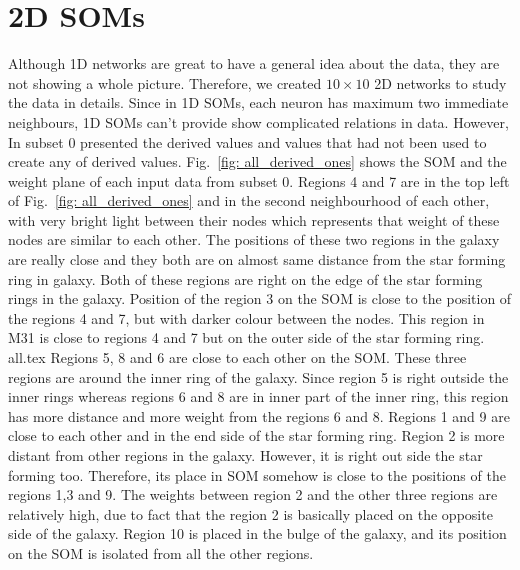  \section{2D SOMs}
 Although 1D networks are great to have a general idea about the data, they are not showing a whole picture. 
        Therefore, we created $10\times10$ 2D networks to study the data in details.
 Since in 1D SOMs, each neuron has maximum two immediate neighbours, 1D SOMs can't provide show complicated relations in data.
However, 
            In subset 0 presented the derived values and values that had not been used to create any of derived values.
            Fig.~\ref{fig: all_derived_ones} shows the SOM and the weight plane of each input data from subset 0.
            Regions 4 and 7 are in the top left of Fig.~\ref{fig: all_derived_ones} and in the second neighbourhood of each other, with very bright light between their nodes which represents that weight of these nodes are similar to each other. 
            The positions of these two regions in the galaxy are really close and they both are on almost same distance from the star forming ring in galaxy.
            Both of these regions are right on the edge of the star forming rings in the galaxy. 
            Position of the region 3 on the SOM is close to the position of the regions 4 and 7, but with darker colour between the nodes. 
            This region in M31 is close to regions 4 and 7 but on the outer side of the star forming ring.
            {all.tex}
            Regions 5, 8 and 6 are close to each other on the SOM.
            These three regions are around the inner ring of the galaxy.
            Since region 5 is right outside the inner rings whereas regions 6 and 8 are in inner part of the inner ring, this region has more distance and more weight from the regions 6 and 8.
            Regions 1 and 9 are close to each other and in the end side of the star forming ring. 
            Region 2 is more distant from other regions in the galaxy. 
            However, it is right out side the star forming too. 
            Therefore, its place in SOM somehow is close to the positions of the regions 1,3 and 9.
            The weights between region 2 and the other three regions are relatively high, due to fact that the region 2 is basically placed on the opposite side of the galaxy. 
            Region 10 is placed in the bulge of the galaxy, and its position on the SOM is isolated from all the other regions. 

